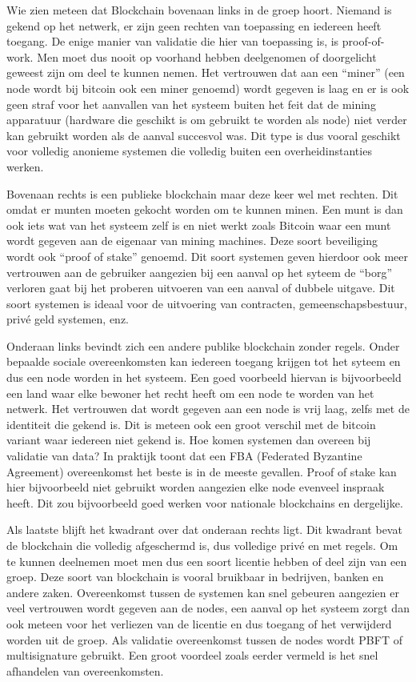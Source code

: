 Wie zien meteen dat Blockchain bovenaan links in de groep hoort. Niemand is gekend op het netwerk, er zijn geen rechten van toepassing en iedereen heeft toegang. De enige manier van validatie die hier van toepassing is, is proof-of-work. Men moet dus nooit op voorhand hebben deelgenomen of doorgelicht geweest zijn om deel te kunnen nemen. Het vertrouwen dat aan een ``miner'' (een node wordt bij bitcoin ook een miner genoemd) wordt gegeven is laag en er is ook geen straf voor het aanvallen van het systeem buiten het feit dat de mining apparatuur (hardware die geschikt is om gebruikt te worden als node) niet verder kan gebruikt worden als de aanval succesvol was. Dit type is dus vooral geschikt voor volledig anonieme systemen die volledig buiten een overheidinstanties werken. 

Bovenaan rechts is een publieke blockchain maar deze keer wel met rechten. Dit omdat er munten moeten gekocht worden om te kunnen minen. Een munt is dan ook iets wat van het systeem zelf is en niet werkt zoals Bitcoin waar een munt wordt gegeven aan de eigenaar van mining machines. Deze soort beveiliging wordt ook ``proof of stake'' genoemd. Dit soort systemen geven hierdoor ook meer vertrouwen aan de gebruiker aangezien bij een aanval op het syteem de ``borg'' verloren gaat bij het proberen uitvoeren van een aanval of dubbele uitgave. Dit soort systemen is ideaal voor de uitvoering van contracten, gemeenschapsbestuur, privé geld systemen, enz. 

Onderaan links bevindt zich een andere publike blockchain zonder regels. Onder bepaalde sociale overeenkomsten kan iedereen toegang krijgen tot het syteem en dus een node worden in het systeem. Een goed voorbeeld hiervan is bijvoorbeeld een land waar elke bewoner het recht heeft om een node te worden van het netwerk. Het vertrouwen dat wordt gegeven aan een node is vrij laag, zelfs met de identiteit die gekend is. Dit is meteen ook een groot verschil met de bitcoin variant waar iedereen niet gekend is. Hoe komen systemen dan overeen bij validatie van data? In praktijk toont dat een FBA (Federated Byzantine Agreement) overeenkomst het beste is in de meeste gevallen. Proof of stake kan hier bijvoorbeeld niet gebruikt worden aangezien elke node evenveel inspraak heeft. Dit zou bijvoorbeeld goed werken voor nationale blockchains en dergelijke. 

Als laatste blijft het kwadrant over dat onderaan rechts ligt. Dit kwadrant bevat de blockchain die volledig afgeschermd is, dus volledige privé en met regels. Om te kunnen deelnemen moet men dus een soort licentie hebben of deel zijn van een groep. Deze soort van blockchain is vooral bruikbaar in bedrijven, banken en andere zaken. Overeenkomst tussen de systemen kan snel gebeuren aangezien er veel vertrouwen wordt gegeven aan de nodes, een aanval op het systeem zorgt dan ook meteen voor het verliezen van de licentie en dus toegang of het verwijderd worden uit de groep. Als validatie overeenkomst tussen de nodes wordt PBFT of multisignature gebruikt. Een groot voordeel zoals eerder vermeld is het snel afhandelen van overeenkomsten. 

